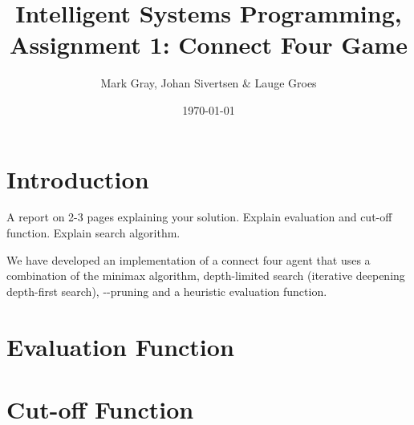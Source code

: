 \documentclass[11pt, a4paper]{article}
\author{Mark Gray, Johan Sivertsen \& Lauge Groes}
\title{Intelligent Systems Programming, Assignment 1: Connect Four Game}
\date{\today}
\begin{document}
\maketitle
\newpage
\section*{Introduction}

A report on 2-3 pages explaining your solution. Explain evaluation and cut-off
function. Explain search algorithm.

We have developed an implementation of a connect four agent that uses a
combination of the minimax algorithm, depth-limited search (iterative deepening
depth-first search), \alpha-\beta-pruning and a heuristic evaluation function. 

\section*{Evaluation Function}

\section*{Cut-off Function}
\end{document}
